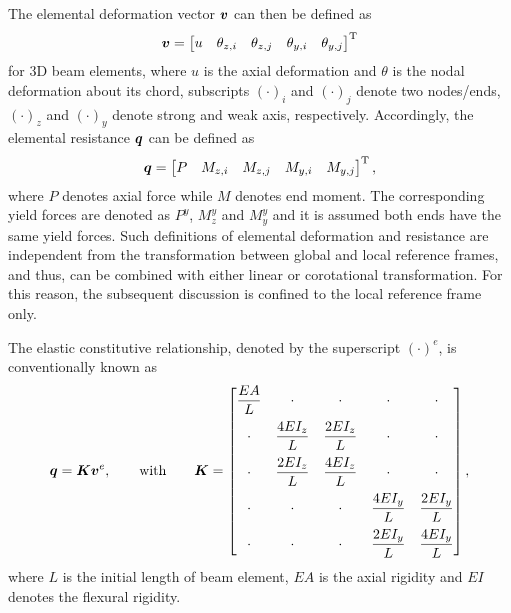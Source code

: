 The elemental deformation vector $\bm{v}$ can then be defined as
\begin{gather}
\bm{v}=\begin{bmatrix}
u&\theta_{z,i}&\theta_{z,j}&\theta_{y,i}&\theta_{y,j}
\end{bmatrix}^{\mathrm{T}}
\end{gather}
for 3D beam elements, where $u$ is the axial deformation and $\theta$ is the nodal deformation about its chord, subscripts $\left(\cdot\right)_i$ and $\left(\cdot\right)_j$ denote two nodes/ends, $\left(\cdot\right)_z$ and $\left(\cdot\right)_y$ denote strong and weak axis, respectively.
Accordingly, the elemental resistance $\bm{q}$ can be defined as
\begin{gather}
\bm{q}=\begin{bmatrix}
P&M_{z,i}&M_{z,j}&M_{y,i}&M_{y,j}
\end{bmatrix}^{\mathrm{T}},
\end{gather}
where $P$ denotes axial force while $M$ denotes end moment.
The corresponding yield forces are denoted as $P^y$, $M_z^y$ and $M_y^y$ and it is assumed both ends have the same yield forces.
Such definitions of elemental deformation and resistance are independent from the transformation between global and local reference frames, and thus, can be combined with either linear or corotational transformation.
For this reason, the subsequent discussion is confined to the local reference frame only.

The elastic constitutive relationship, denoted by the superscript $\left(\cdot\right)^e$, is conventionally known as
\begin{gather}
\bm{q}=\bm{K}\bm{v}^e,\qquad\text{with}\qquad\bm{K}=\begin{bmatrix}
\dfrac{EA}{L}&\cdot&\cdot&\cdot&\cdot\\[3mm]
\cdot&\dfrac{4EI_z}{L}&\dfrac{2EI_z}{L}&\cdot&\cdot\\[3mm]
\cdot&\dfrac{2EI_z}{L}&\dfrac{4EI_z}{L}&\cdot&\cdot\\[3mm]
\cdot&\cdot&\cdot&\dfrac{4EI_y}{L}&\dfrac{2EI_y}{L}\\[3mm]
\cdot&\cdot&\cdot&\dfrac{2EI_y}{L}&\dfrac{4EI_y}{L}
\end{bmatrix},
\end{gather}
where $L$ is the initial length of beam element, $EA$ is the axial rigidity and $EI$ denotes the flexural rigidity.
